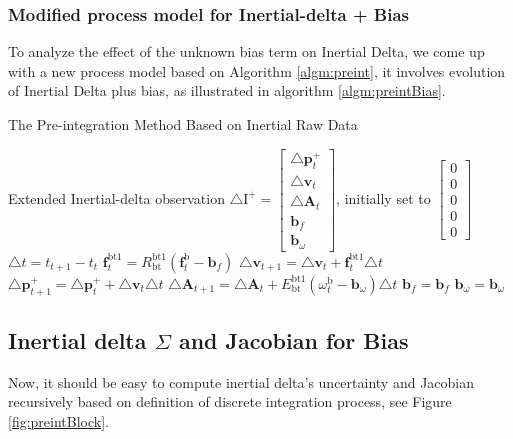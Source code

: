 \documentclass[12pt]{article}   %
\begin{document}
\subsubsection{Modified process model for Inertial-delta + Bias}
To analyze the effect of the unknown bias term on Inertial Delta, we come up with a new process model based on Algorithm \ref{algm:preint}, it involves evolution of Inertial Delta plus bias, as illustrated in algorithm \ref{algm:preintBias}.
\begin{algorithm}
	\caption{The Pre-integration Method Based on Inertial Raw Data}
	\label{algm:preintBias}		
	\begin{algorithmic}
		\STATE Extended Inertial-delta observation $ \triangle \bm{\mathrm{I}}^+ = \begin{bmatrix} 
		\triangle \textbf{p}_{t}^+ \\
		\triangle \textbf{v}_{t} \\
		\triangle \textbf{A} _{t} \\
		\textbf{b}_f \\
		\textbf{b}_{\omega}
		\end{bmatrix}$, initially set to $\begin{bmatrix} 
		0 \\ 
		0 \\ 
		0 \\
		0 \\
		0
		\end{bmatrix}$
		\STATE $\triangle t =  t_{t+1} - t_t$ 
		\STATE $\textbf{f}_t^{\mathrm{bt1}} = R_{\mathrm{bt}}^{\mathrm{bt1}} (\textbf{f}_t^{\mathrm{b}} - \textbf{b}_f)$ 
		\STATE $\triangle \textbf{v}_{t+1} = \triangle \textbf{v}_{t} + \textbf{f}_t^{\mathrm{bt1}} \triangle t$ 
		\STATE $\triangle \textbf{p}_{t+1}^+ = \triangle \textbf{p}_{t}^+ + \triangle \textbf{v}_t \triangle t$ 
		\STATE $\triangle \textbf{A} _{t+1} = \triangle \textbf{A} _{t} + E_{\mathrm{bt}}^{\mathrm{bt1}} (\omega _t^{\mathrm{b}} - \textbf{b}_\omega ) \triangle t$ 
		\STATE $\textbf{b}_f = \textbf{b}_f$
		\STATE $\textbf{b}_{\omega} = \textbf{b}_{\omega}$
		\ENDFOR
	\end{algorithmic}
\end{algorithm}

\subsection{Inertial delta $\Sigma$ and Jacobian for Bias}
Now, it should be easy to compute inertial delta's uncertainty and Jacobian recursively based on definition of discrete integration process, see Figure \ref{fig:preintBlock}. 
\end{document}
